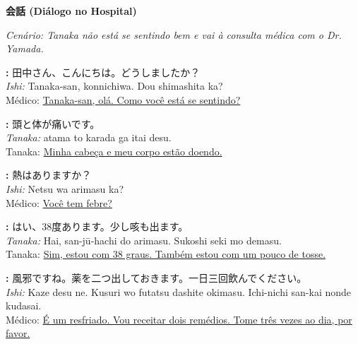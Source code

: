 \documentclass[12pt,a4paper]{article}
\begin{document}
\vspace{0.6cm}

\begin{center}
    {\LARGE\bfseries 会話 (Diálogo no Hospital)}
\end{center}

\textit{Cenário: Tanaka não está se sentindo bem e vai à consulta médica com o Dr. Yamada.}

\vspace{0.8em}

\textbf{:} 田中さん、こんにちは。どうしましたか？\\
\textit{Ishi:} Tanaka-san, konnichiwa. Dou shimashita ka?\\
Médico: \underline{Tanaka-san, olá. Como você está se sentindo?} 

\vspace{0.4em}

\textbf{:} 頭と体が痛いです。\\
\textit{Tanaka:}  atama to karada ga itai desu.\\
Tanaka: \underline{Minha cabeça e meu corpo estão doendo.} 

\vspace{0.4em}

\textbf{:} 熱はありますか？\\
\textit{Ishi:} Netsu wa arimasu ka?\\
Médico: \underline{Você tem febre?} 

\vspace{0.4em}

\textbf{:} はい、38度あります。少し咳も出ます。\\
\textit{Tanaka:} Hai, san-jū-hachi do arimasu. Sukoshi seki mo demasu.\\
Tanaka: \underline{Sim, estou com 38 graus. Também estou com um pouco de tosse.} 

\vspace{0.4em}

\textbf{:} 風邪ですね。薬を二つ出しておきます。一日三回飲んでください。\\
\textit{Ishi:} Kaze desu ne. Kusuri wo futatsu dashite okimasu. Ichi-nichi san-kai nonde kudasai.\\
Médico: \underline{É um resfriado. Vou receitar dois remédios. Tome três vezes ao dia, por favor.} 

\vspace{0.4em}
\end{document}
